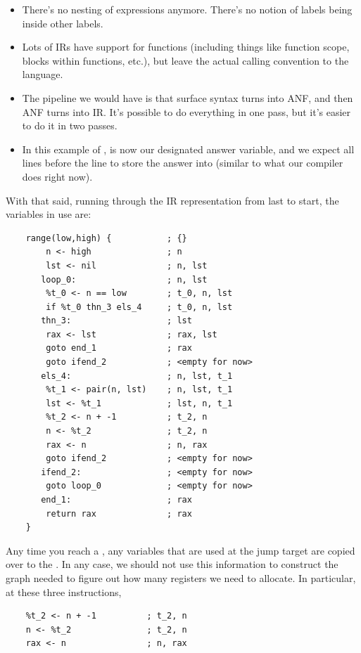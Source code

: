 \begin{itemize}
    \item There's no nesting of expressions anymore. There's no notion of labels being inside other labels. 
    \item Lots of IRs have support for functions (including things like function scope, blocks within functions, etc.), but leave the actual calling convention to the language. 
    \item The pipeline we would have is that surface syntax turns into ANF, and then ANF turns into IR. It's possible to do everything in one pass, but it's easier to do it in two passes.
    \item In this example of ,  is now our designated answer variable, and we expect all lines before the  line to store the answer into  (similar to what our compiler does right now).
\end{itemize}
With that said, running through the IR representation from last to start, the variables in use are: 
\begin{verbatim}
    range(low,high) {           ; {}
        n <- high               ; n
        lst <- nil              ; n, lst 
       loop_0:                  ; n, lst
        %t_0 <- n == low        ; t_0, n, lst 
        if %t_0 thn_3 els_4     ; t_0, n, lst  
       thn_3:                   ; lst 
        rax <- lst              ; rax, lst 
        goto end_1              ; rax 
        goto ifend_2            ; <empty for now>
       els_4:                   ; n, lst, t_1
        %t_1 <- pair(n, lst)    ; n, lst, t_1
        lst <- %t_1             ; lst, n, t_1
        %t_2 <- n + -1          ; t_2, n 
        n <- %t_2               ; t_2, n 
        rax <- n                ; n, rax 
        goto ifend_2            ; <empty for now>
       ifend_2:                 ; <empty for now>
        goto loop_0             ; <empty for now>
       end_1:                   ; rax 
        return rax              ; rax
    }\end{verbatim}
Any time you reach a , any variables that are used at the jump target are copied over to the . In any case, we should not use this information to construct the graph needed to figure out how many registers we need to allocate. In particular, at these three instructions,
\begin{verbatim}
    %t_2 <- n + -1          ; t_2, n 
    n <- %t_2               ; t_2, n 
    rax <- n                ; n, rax \end{verbatim}
